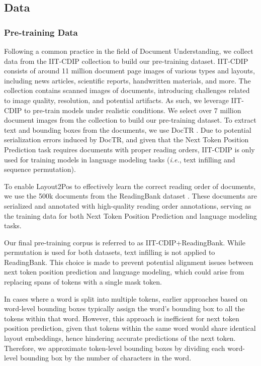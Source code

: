 \subsection{Data}

\subsubsection{Pre-training Data}

Following a common practice in the field of Document Understanding, we collect data from the IIT-CDIP collection \citep{lewis2006building} to build our pre-training dataset. IIT-CDIP consists of around 11 million document page images of various types and layouts, including news articles, scientific reports, handwritten materials, and more. The collection contains scanned images of documents, introducing challenges related to image quality, resolution, and potential artifacts. As such, we leverage IIT-CDIP to pre-train models under realistic conditions. We select over 7 million document images from the collection to build our pre-training dataset. To extract text and bounding boxes from the documents, we use DocTR \citep{doctr2021}. Due to potential serialization errors induced by DocTR, and given that the Next Token Position Prediction task requires documents with proper reading orders, IIT-CDIP is only used for training models in language modeling tasks (\textit{i.e.}, text infilling and sequence permutation). 

To enable Layout2Pos to effectively learn the correct reading order of documents, we use the 500k documents from the ReadingBank dataset \citep{wang2021layoutreader}. These documents are serialized and annotated with high-quality reading order annotations, serving as the training data for both Next Token Position Prediction and language modeling tasks. 

Our final pre-training corpus is referred to as IIT-CDIP+ReadingBank. While permutation is used for both datasets, text infilling is not applied to ReadingBank. This choice is made to prevent potential alignment issues between next token position prediction and language modeling, which could arise from replacing spans of tokens with a single mask token.

In cases where a word is split into multiple tokens, earlier approaches based on word-level bounding boxes typically assign the word's bounding box to all the tokens within that word. However, this approach is inefficient for next token position prediction, given that tokens within the same word would share identical layout embeddings, hence hindering accurate predictions of the next token. Therefore, we approximate token-level bounding boxes by dividing each word-level bounding box by the number of characters in the word.

